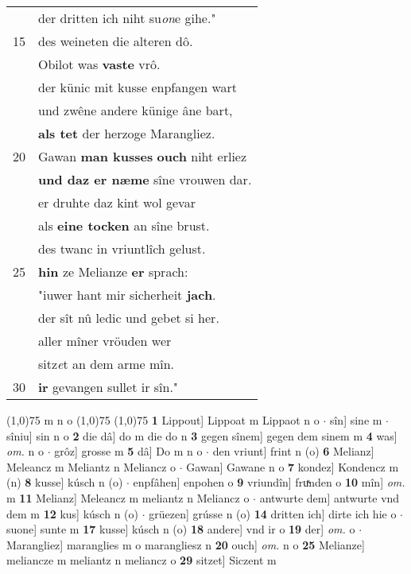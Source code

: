 \documentclass[8pt,a4paper,notitlepage]{article}
\begin{document}
\begin{table}[ht]
\begin{minipage}[t]{0.5\linewidth}
\begin{tabular}{rl}
 & der dritten ich niht su\textit{on}e gihe."\\ 
15 & des weineten die alteren dô.\\ 
 & Obilot was \textbf{vaste} vrô.\\ 
 & der künic mit kusse enpfangen wart\\ 
 & und zwêne andere künige âne bart,\\ 
 & \textbf{als tet} der herzoge Marangliez.\\ 
20 & Gawan \textbf{man kusses} \textbf{ouch} niht erliez\\ 
 & \textbf{und daz er næme} sîne vrouwen dar.\\ 
 & er druhte daz kint wol gevar\\ 
 & als \textbf{eine tocken} an sîne brust.\\ 
 & des twanc in vriuntlîch gelust.\\ 
25 & \textbf{hin} ze Melianze \textbf{er} sprach:\\ 
 & "iuwer hant mir sicherheit \textbf{jach}.\\ 
 & der sît nû ledic und gebet si her.\\ 
 & aller mîner vröuden wer\\ 
 & sitz\textit{e}t an dem arme mîn.\\ 
30 & \textbf{ir} gevangen sullet ir sîn."\\ 
\end{tabular}
\scriptsize
\line(1,0){75} \newline
m n o \newline
\line(1,0){75} \newline
\newline
\line(1,0){75} \newline
\textbf{1} Lippout] Lippoat m Lippaot n o  $\cdot$ sîn] sine m  $\cdot$ sîniu] sin n o \textbf{2} die dâ] do m die do n \textbf{3} gegen sînem] gegen dem sinem m \textbf{4} was] \textit{om.} n o  $\cdot$ grôz] grosse m \textbf{5} dâ] Do m n o  $\cdot$ den vriunt] frint n (o) \textbf{6} Melianz] Meleancz m Meliantz n Meliancz o  $\cdot$ Gawan] Gawane n o \textbf{7} kondez] Kondencz m (n) \textbf{8} kusse] kúsch n (o)  $\cdot$ enpfâhen] enpohen o \textbf{9} vriundîn] fruͯnden o \textbf{10} mîn] \textit{om.} m \textbf{11} Melianz] Meleancz m meliantz n Meliancz o  $\cdot$ antwurte dem] antwurte vnd dem m \textbf{12} kus] kúsch n (o)  $\cdot$ grüezen] grússe n (o) \textbf{14} dritten ich] dirte ich hie o  $\cdot$ suone] sunte m \textbf{17} kusse] kúsch n (o) \textbf{18} andere] vnd ir o \textbf{19} der] \textit{om.} o  $\cdot$ Marangliez] maranglies m o marangliesz n \textbf{20} ouch] \textit{om.} n o \textbf{25} Melianze] meliancze m meliantz n meliancz o \textbf{29} sitzet] Siczent m \newline
\end{minipage}
\end{table}
\end{document}
